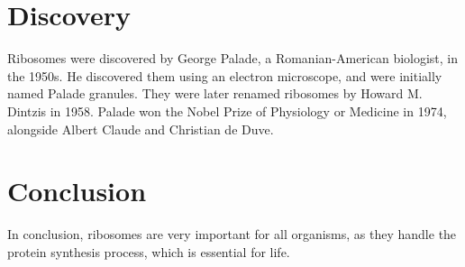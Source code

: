 \documentclass{article}
\begin{document}
\section{Discovery}
Ribosomes were discovered by George Palade, a Romanian-American biologist, in the 1950s. He discovered them using an electron microscope, and were initially named Palade granules. They were later renamed ribosomes by Howard M. Dintzis in 1958. Palade won the Nobel Prize of Physiology or Medicine in 1974, alongside Albert Claude and Christian de Duve.

\section{Conclusion}
In conclusion, ribosomes are very important for all organisms, as they handle the protein synthesis process, which is essential for life.
\end{document}
